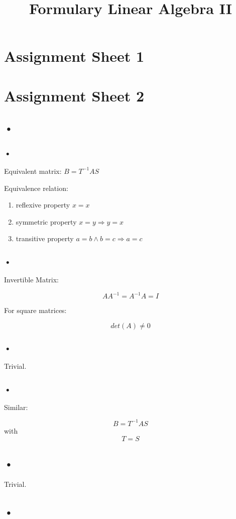 \documentclass{report}
\title{Formulary Linear Algebra II}
\begin{document}
\chapter{Assignment Sheet 1}

\chapter{Assignment Sheet 2}
\section{•}
\subsection{•}
Equivalent matrix:
$B=T^{-1}AS$

Equivalence relation:
\begin{enumerate}
\item reflexive property $x=x$
\item symmetric property $x=y \Rightarrow y=x$
\item transitive property $a=b \land b=c \Rightarrow a=c$
\end{enumerate}
\subsection{•}
Invertible Matrix:

$$AA^{-1}=A^{-1}A=I$$

For square matrices:

$$det(A) \neq 0$$
\subsection{•}
Trivial.
\subsection{•}
Similar:

$$B=T^{-1}AS$$ with $$T=S$$

\section{•}
Trivial.

\section{•}
\end{document}
